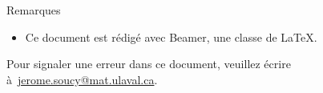 \documentclass[nuit,charter,pied]{BeamerJS}
\begin{document}
\begin{frame}{Remarques}
\begin{rems}
	\begin{itemize}
		\item Ce document est rédigé avec Beamer, une classe de \LaTeX.
	\end{itemize}
\end{rems}
	\vfill
	\footnotesize Pour signaler une erreur dans ce document, veuillez écrire à~\href{mailto:jerome.soucy@mat.ulaval.ca}{jerome.soucy@mat.ulaval.ca}.
\end{frame}
\end{document}

